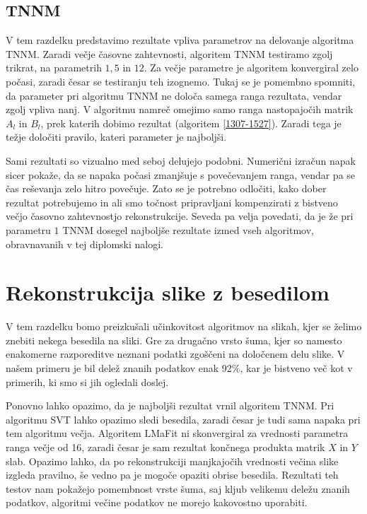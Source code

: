 \subsection{TNNM}
V tem razdelku predstavimo rezultate vpliva parametrov na delovanje algoritma TNNM. Zaradi večje časovne zahtevnosti, algoritem TNNM testiramo zgolj trikrat, na parametrih $1, 5$ in $12$. Za večje parametre je algoritem konvergiral zelo počasi, zaradi česar se testiranju teh izognemo. Tukaj se je pomembno spomniti, da parameter pri algoritmu TNNM ne določa samega ranga rezultata, vendar zgolj vpliva nanj.
V algoritmu namreč omejimo samo ranga nastopajočih matrik $A_l$ in $B_l$, prek katerih dobimo rezultat (algoritem \ref{1307-1527}). Zaradi tega je težje določiti pravilo, kateri parameter je najboljši.

\FloatBarrier


Sami rezultati so vizualno med seboj delujejo podobni. Numerični izračun napak sicer pokaže, da se napaka počasi zmanjšuje s povečevanjem ranga, vendar pa se čas reševanja zelo hitro povečuje. Zato se je potrebno odločiti, kako dober rezultat potrebujemo in ali smo točnost pripravljani kompenzirati z bistveno večjo časovno zahtevnostjo rekonstrukcije. Seveda pa velja povedati, da je že pri parametru $1$ TNNM dosegel najboljše rezultate izmed vseh algoritmov, obravnavanih v tej diplomski nalogi.

\section{Rekonstrukcija slike z besedilom} \label{1307-2254}
V tem razdelku bomo preizkušali učinkovitost algoritmov na slikah, kjer se želimo znebiti nekega besedila na sliki. Gre za drugačno vrsto šuma, kjer so namesto enakomerne razporeditve neznani podatki zgoščeni na določenem delu slike. V našem primeru je bil delež znanih podatkov enak 92\%, kar je bistveno več kot v primerih, ki smo si jih ogledali doslej.


Ponovno lahko opazimo, da je najboljši rezultat vrnil algoritem TNNM. Pri algoritmu SVT lahko opazimo sledi besedila, zaradi česar je tudi sama napaka pri tem algoritmu večja. Algoritem LMaFit ni skonvergiral za vrednosti parametra ranga večje od 16, zaradi česar je sam rezultat končnega produkta matrik $X$ in $Y$ slab. Opazimo lahko, da po rekonstrukciji  manjkajočih vrednosti večina slike izgleda pravilno, še vedno pa je mogoče opaziti obrise besedila.
Rezultati teh testov nam pokažejo pomembnost vrste šuma, saj kljub velikemu deležu znanih podatkov, algoritmi večine podatkov ne morejo kakovostno uporabiti.

